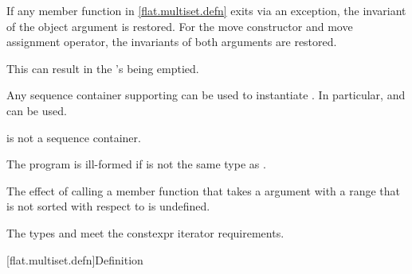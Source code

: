 \pnum
If any member function in \ref{flat.multiset.defn} exits via an exception,
the invariant of the object argument is restored.
For the move constructor and move assignment operator,
the invariants of both arguments are restored.
\begin{note}
This can result in the 's being emptied.
\end{note}

\pnum
Any sequence container
supporting 
can be used to instantiate .
In particular,
 and  can be used.
\begin{note}
 is not a sequence container.
\end{note}

\pnum
The program is ill-formed if  is not the same type
as .

\pnum
The effect of calling a member function
that takes a  argument with a range
that is not sorted with respect to  is undefined.

\pnum
The types  and  meet
the constexpr iterator requirements.

[flat.multiset.defn]{Definition}

